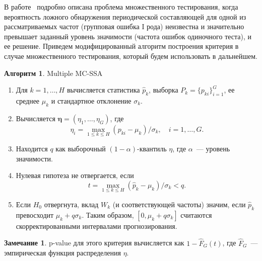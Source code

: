 \documentclass[specialist,
substylefile = spbu_report.rtx,
subf,href,colorlinks=true, 12pt]{disser}
\theoremstyle{definition}
\newtheorem{algorithm}{Алгоритм}
\newtheorem{remark}{Замечание}
\begin{document}
В работе~\cite{Golyandina2023} подробно описана проблема множественного тестирования, когда вероятность ложного обнаружения периодической составляющей для одной из рассматриваемых частот (групповая ошибка I рода) неизвестна и значительно превышает заданный уровень значимости (частота ошибок одиночного теста), и ее решение. Приведем модифицированный алгоритм построения критерия в случае множественного тестирования, который будем использовать в дальнейшем.
\begin{algorithm}{Multiple MC-SSA~\cite{Golyandina2023}}\label{alg:multiple_mc-ssa}
	\begin{enumerate}
		\item Для $k=1,\dots,H$ вычисляется статистика $\widehat{p}_k$, выборка $P_k=\{p_{ki}\}_{i=1}^G$, ее среднее $\mu_k$ и стандартное отклонение $\sigma_k$.
		\item Вычисляется $\mathbf{\eta}=(\eta_1,\dots,\eta_G)$, где
		      \[
			      \eta_i=\max_{1\leqslant k\leqslant H}(p_{ki}-\mu_k)/\sigma_k,\quad i=1,\dots,G.
		      \]
		\item Находится $q$ как выборочный $(1-\alpha)$-квантиль $\eta$, где $\alpha$~--- уровень значимости.
		\item Нулевая гипотеза не отвергается, если
		      \[
			      t = \max_{1\leqslant k\leqslant H}(\widehat{p}_k-\mu_k)/\sigma_k<q.
		      \]
		\item Если $H_0$ отвергнута, вклад $W_k$ (и соответствующей частоты) значим, если $\widehat{p}_k$ превосходит $\mu_k+q\sigma_k$. Таким образом, $[0,\mu_k+q\sigma_k]$ считаются скорректированными интервалами прогнозирования.
	\end{enumerate}
\end{algorithm}

\begin{remark}
	p-value для этого критерия вычисляется как $1-\hat F_G(t)$, где $\hat F_G$~--- эмпирическая функция распределения $\eta$.
\end{remark}



\end{document}
